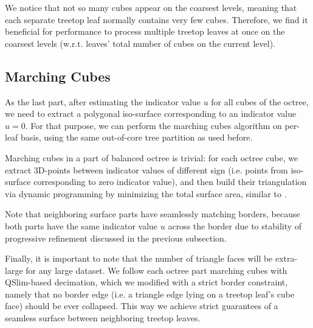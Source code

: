 \documentclass[10pt,twocolumn,letterpaper]{article}
\begin{document}
We notice that not so many cubes appear on the coarsest levels, meaning that each separate treetop leaf normally contains very few cubes.
Therefore, we find it beneficial for performance to process multiple treetop leaves at once on the coarsest levels (w.r.t. leaves' total number of cubes on the current level).

\subsection{Marching Cubes}
\label{sec:cubes-marching}

As the last part, after estimating the indicator value $u$ for all cubes of the octree, we need to extract a polygonal iso-surface corresponding to an
indicator value $u=0$. For that purpose, we can perform the marching cubes algorithm on per-leaf basis, using the same out-of-core tree partition as used before.

Marching cubes in a part of balanced octree is trivial: for each octree cube, we extract 3D-points between indicator values of different
sign (i.e. points from iso-surface corresponding to zero indicator value), and then build their triangulation via dynamic programming
by minimizing the total surface area, similar to \cite{bloomenthal1988polygonization}.

Note that neighboring surface parts have seamlessly matching borders,
because both parts have the same indicator value $u$ across the border due to stability of progressive refinement
discussed in the previous subsection.

Finally, it is important to note that the number of triangle faces will be extra-large for any large dataset.
We follow each octree part marching cubes with QSlim-based \cite{garland1998simplifying} decimation,
which we modified with a strict border constraint, namely that no border edge (i.e. a triangle edge lying on a treetop leaf's cube face) should be ever collapsed.
This way we achieve strict guarantees of a seamless surface between neighboring treetop leaves.
\end{document}
